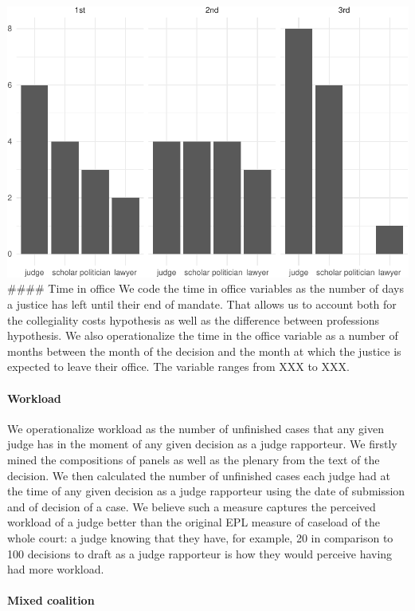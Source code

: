 \documentclass[
  11pt,
]{article}
\begin{document}
\includegraphics{separate_opinions_files/figure-latex/unnamed-chunk-3-1.pdf}
\#\#\#\# Time in office We code the time in office variables as the
number of days a justice has left until their end of mandate. That
allows us to account both for the collegiality costs hypothesis as well
as the difference between professions hypothesis. We also operationalize
the time in the office variable as a number of months between the month
of the decision and the month at which the justice is expected to leave
their office. The variable ranges from XXX to XXX.

\hypertarget{workload}{%
\paragraph{Workload}\label{workload}}

We operationalize workload as the number of unfinished cases that any
given judge has in the moment of any given decision as a judge
rapporteur. We firstly mined the compositions of panels as well as the
plenary from the text of the decision. We then calculated the number of
unfinished cases each judge had at the time of any given decision as a
judge rapporteur using the date of submission and of decision of a case.
We believe such a measure captures the perceived workload of a judge
better than the original EPL measure of caseload of the whole court: a
judge knowing that they have, for example, 20 in comparison to 100
decisions to draft as a judge rapporteur is how they would perceive
having had more workload.

\hypertarget{mixed-coalition}{%
\paragraph{Mixed coalition}\label{mixed-coalition}}
\end{document}
